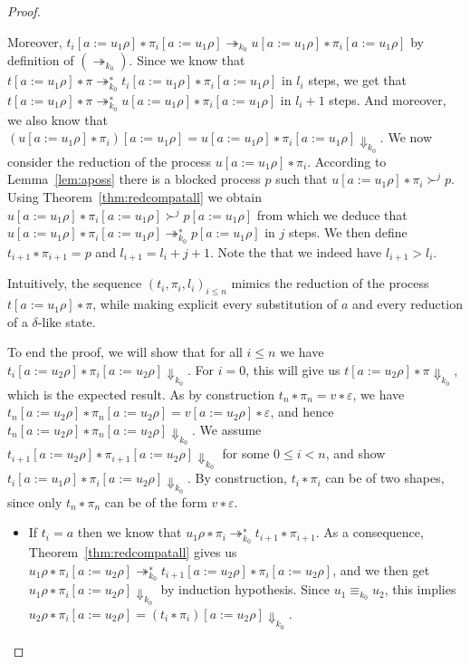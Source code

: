\begin{proof}
\begin{itemize}
      Moreover, ${t_i[a := u_1ρ] ∗ π_i[a := u_1ρ]} ↠_{k_0}
      {u[a := u_1ρ] ∗ π_i[a := u_1ρ]}$ by definition of $({↠}_{k_0})$. Since
      we know that ${t[a := u_1ρ] ∗ π} ↠_{k_0}^{∗} {t_i[a := u_1ρ] ∗ π_i[a :=
      u_1ρ]}$ in $l_i$ steps, we get that ${t[a := u_1ρ] ∗ π} ↠_{k_0}^{∗}
      {u[a := u_1ρ] ∗ π_i[a := u_1ρ]}$ in $l_i+1$ steps. And moreover, we also
      know that ${(u[a := u_1ρ] ∗ π_i)[a := u_1ρ]} = {u[a := u_1ρ] ∗ π_i[a :=
      u_1ρ]} {⇓}_{k_0}$.
      We now consider the reduction of the process ${u[a := u_1ρ]∗π_i}$.
      According to Lemma~\ref{lem:aposs} there is a blocked process $p$ such
      that ${u[a := u_1ρ]∗π_i} ≻^j p$. Using Theorem~\ref{thm:redcompatall} we
      obtain ${u[a := u_1ρ] ∗ π_i[a := u_1ρ]} ≻^j {p[a := u_1ρ]}$ from which
      we deduce that ${u[a := u_1ρ] ∗ π_i[a := u_1ρ]} ↠_{k_0}^{∗} {p[a :=
      u_1ρ]}$ in $j$ steps. We then define ${t_{i+1} ∗ π_{i+1}} = p$ and
      $l_{i+1} = l_i + j + 1$. Note the that we indeed have $l_{i+1} > l_i$.
  \end{itemize}
  Intuitively, the sequence $(t_i,π_i,l_i)_{i ≤ n}$ mimics the reduction of
  the process $t[a := u_1ρ] ∗ π$, while making explicit every substitution of
  $a$ and every reduction of a $δ$-like state.

  To end the proof, we will show that for all $i ≤ n$ we have
  ${t_i[a := u_2ρ] ∗ π_i[a := u_2ρ]} {⇓}_{k_0}$. For $i = 0$, this will give
  us ${t[a := u_2ρ]∗π} {⇓}_{k_0}$, which is the expected result. As by
  construction ${t_n ∗ π_n} = {v ∗ ε}$, we have ${t_n[a := u_2ρ] ∗ π_n[a :=
  u_2ρ]} = {v[a := u_2ρ]∗ε}$, and hence ${t_n[a := u_2ρ] ∗ π_n[a := u_2ρ]}
  {⇓}_{k_0}$.
  We assume ${t_{i+1}[a := u_2ρ] ∗ π_{i+1}[a := u_2ρ]} {⇓}_{k_0}$ for
  some $0 ≤ i < n$, and show ${t_i[a := u_1ρ] ∗ π_i[a := u_2ρ]} {⇓}_{k_0}$.
  By construction, $t_i ∗ π_i$ can be of two shapes, since only $t_n ∗ π_n$
  can be of the form $v ∗ ε$.
  \begin{itemize}
    \item If $t_i = a$ then we know that ${u_1ρ ∗ π_i} ↠_{k_0}^{∗}
      {t_{i+1} ∗ π_{i+1}}$. As a consequence, Theorem~\ref{thm:redcompatall}
      gives us ${u_1ρ ∗ π_i[a := u_2ρ]} ↠_{k_0}^{∗} {t_{i+1}[a := u_2ρ] ∗
      π_i[a := u_2ρ]}$, and we then get ${u_1ρ ∗ π_i[a := u_2ρ]} {⇓}_{k_0}$
      by induction hypothesis. Since $u_1 ≡_{k_0} u_2$, this implies
      ${u_2ρ ∗ π_i[a := u_2ρ]} = {(t_i ∗ π_i)[a := u_2ρ]} {⇓}_{k_0}$.


\end{itemize}
\end{proof}
